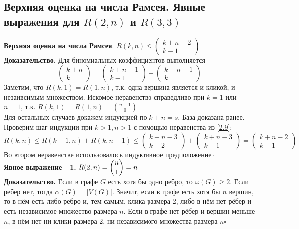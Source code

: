 \documentclass[a4paper]{article}
\begin{document}
\subsection{Верхняя оценка на числа Рамсея. Явные выражения для \texorpdfstring{$R(2,n)$}{R(2,n)} и \texorpdfstring{$R(3,3)$}{R(3,3)}}
\textbf{Верхняя оценка на числа Рамсея}. $R(k,n)\leqslant\begin{pmatrix}
    k+n-2\\
    k-1
\end{pmatrix}$\\[2mm]
\indent\textbf{Доказательство.} Для биномиальных коэффициентов выполняется $$\begin{pmatrix}
    k+n\\
    k
\end{pmatrix}=\begin{pmatrix}
    k+n-1\\
    k-1
\end{pmatrix}+\begin{pmatrix}
    k+n-1\\
    k
\end{pmatrix}$$
\indent Заметим, что $R(k,1)=R(1,n)$, т.к. одна вершина является и кликой, и незаивсимым множеством. Искомое неравенство справедливо при $k=1$ или $n=1$, т.к. $R(k,1)=R(1,n)=\binom{n-1}{0}$\\[2mm]
\indent Для остальных случаев докажем индукцией по $k+n=s$. База доказана ранее. Проверим шаг индукции при $k>1,n>1$ с помощью неравенства из \ref{2.9}: $$R(k,n)\leqslant R(k-1,n)+R(k,n-1)\leqslant\begin{pmatrix}
    k+n-3\\
    k-2
\end{pmatrix}+\begin{pmatrix}
    k+n-3\\
    k-1
\end{pmatrix}=\begin{pmatrix}
    k+n-2\\
    k-1
\end{pmatrix}$$
Во втором неравенстве использовалось индуктивное предположение\hfill$\square$\\[4mm]
\indent\textbf{Явное выражение—1.} $R(2,n)=\dbinom{n}{1}=n$\\[2mm]
\indent\textbf{Доказательство.} Если в графе $G$ есть хотя бы одно ребро, то $\omega(G)\geqslant2$. Если ребер нет, тогда $\alpha(G)=|V(G)|$. Значит, если в графе есть хотя бы $n$ вершин, то в нём есть либо ребро и, тем самым, клика размера 2, либо в нём нет рёбер и есть независимое множество размера $n$. Если в графе нет рёбер и вершин меньше $n$, в нём нет ни клики размера 2, ни независимого множества размера $n$\hfill$\square$\\[4mm]
\end{document}
